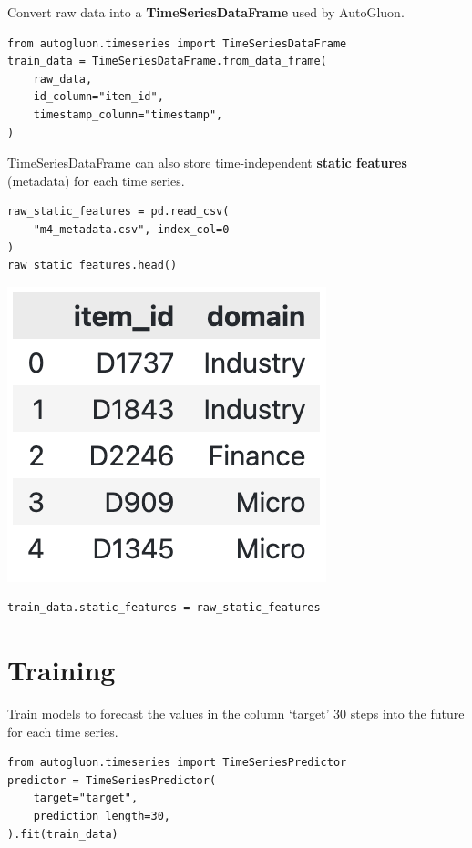 \medskip

Convert raw data into a \textbf{TimeSeriesDataFrame} used by AutoGluon.

\begin{verbatim}
from autogluon.timeseries import TimeSeriesDataFrame
train_data = TimeSeriesDataFrame.from_data_frame(
    raw_data,
    id_column="item_id",
    timestamp_column="timestamp",
)
\end{verbatim}

TimeSeriesDataFrame can also store time-independent \textbf{static features} (metadata) for each time series.

\begin{verbatim}
raw_static_features = pd.read_csv(
    "m4_metadata.csv", index_col=0
)
raw_static_features.head()
\end{verbatim}

\begin{center}
\includegraphics[width=0.22\linewidth]{timeseries/images/static_features.png}
\end{center}

\begin{verbatim}
train_data.static_features = raw_static_features
\end{verbatim}


\vfill\null
\columnbreak

\section*{Training}

Train models to forecast the values in the column ‘target’ 30 steps into the future for each time series.

\begin{verbatim}
from autogluon.timeseries import TimeSeriesPredictor
predictor = TimeSeriesPredictor(
    target="target",
    prediction_length=30,
).fit(train_data)
\end{verbatim}

